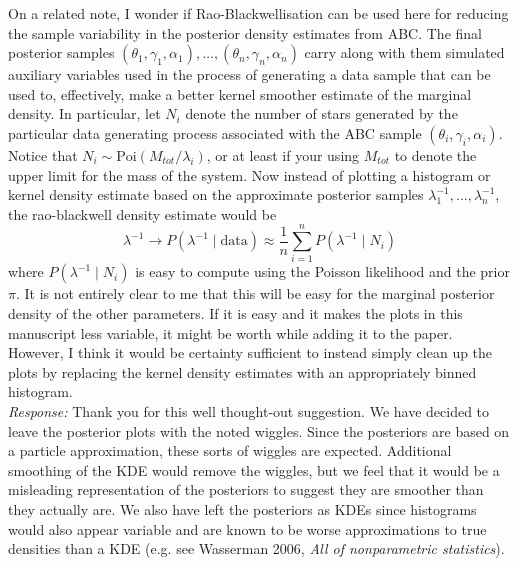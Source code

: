 \documentclass[11pt, oneside]{article}   	%
\begin{document}
\begin{enumerate}
{On a related note, I wonder if Rao-Blackwellisation can be used here for
reducing the sample variability in the posterior density estimates from
ABC. The final posterior samples $(\theta_1, \gamma_1, \alpha_1), \ldots, (\theta_n, \gamma_n, \alpha_n)$ carry along
with them simulated auxiliary variables used in the process of generating a
data sample that can be used to, effectively, make a better kernel smoother
estimate of the marginal density. In particular, let $N_i$ denote the number
of stars generated by the particular data generating process associated with
the ABC sample $(\theta_i, \gamma_i, \alpha_i)$. Notice that $N_i \sim \textrm{Poi}(M_{tot}/\lambda_i)$, or at least
if your using $M_{tot}$ to denote the upper limit for the mass of the system.
Now instead of plotting a histogram or kernel density estimate based on
the approximate posterior samples $\lambda_1^{-1}, \ldots, \lambda_n^{-1}$, the rao-blackwell density
estimate would be
$$
\lambda^{-1} \rightarrow P(\lambda^{-1} \mid \textrm{data}) \approx \frac{1}{n} \sum_{i = 1}^n P(\lambda^{-1} \mid N_i)
$$
where $P(\lambda^{-1} \mid N_i)$ is easy to compute using the Poisson likelihood and the prior $\pi$. It is not entirely clear to me that this will be easy for the marginal posterior density of the other parameters. If it is easy and it makes the plots in this manuscript less variable, it might be worth while adding it to the paper. However, I think it would be certainty sufficient to instead simply clean up the plots by replacing the kernel density estimates with an appropriately binned histogram.
} \\
\noindent \emph{Response:} Thank you for this well thought-out suggestion.  We have decided to leave the posterior plots with the noted wiggles.  Since the posteriors are based on a particle approximation, these sorts of wiggles are expected.  Additional smoothing of the KDE would remove the wiggles, but we feel that it would be a misleading representation of the  posteriors to suggest they are smoother than they actually are.  We also have left the posteriors as KDEs since histograms would also appear variable and are known to be worse approximations to true densities than a KDE (e.g. see Wasserman 2006, \emph{All of nonparametric statistics}).
\bigskip


\end{enumerate}
\end{document}
